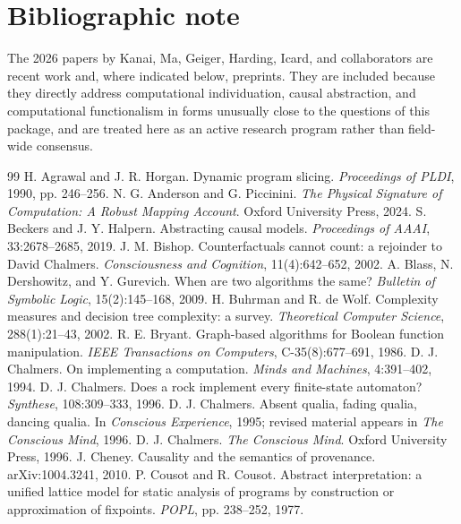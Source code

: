 \documentclass[11pt,a4paper]{article}
\begin{document}
\section*{Bibliographic note}

The 2026 papers by Kanai, Ma, Geiger, Harding, Icard, and collaborators are recent work and, where indicated below, preprints. They are included because they directly address computational individuation, causal abstraction, and computational functionalism in forms unusually close to the questions of this package, and are treated here as an active research program rather than field-wide consensus.

\begin{thebibliography}{99}
 H. Agrawal and J. R. Horgan. Dynamic program slicing. \emph{Proceedings of PLDI}, 1990, pp. 246--256.
 N. G. Anderson and G. Piccinini. \emph{The Physical Signature of Computation: A Robust Mapping Account}. Oxford University Press, 2024.
 S. Beckers and J. Y. Halpern. Abstracting causal models. \emph{Proceedings of AAAI}, 33:2678--2685, 2019.
 J. M. Bishop. Counterfactuals cannot count: a rejoinder to David Chalmers. \emph{Consciousness and Cognition}, 11(4):642--652, 2002.
 A. Blass, N. Dershowitz, and Y. Gurevich. When are two algorithms the same? \emph{Bulletin of Symbolic Logic}, 15(2):145--168, 2009.
 H. Buhrman and R. de Wolf. Complexity measures and decision tree complexity: a survey. \emph{Theoretical Computer Science}, 288(1):21--43, 2002.
 R. E. Bryant. Graph-based algorithms for Boolean function manipulation. \emph{IEEE Transactions on Computers}, C-35(8):677--691, 1986.
 D. J. Chalmers. On implementing a computation. \emph{Minds and Machines}, 4:391--402, 1994.
 D. J. Chalmers. Does a rock implement every finite-state automaton? \emph{Synthese}, 108:309--333, 1996.
 D. J. Chalmers. Absent qualia, fading qualia, dancing qualia. In \emph{Conscious Experience}, 1995; revised material appears in \emph{The Conscious Mind}, 1996.
 D. J. Chalmers. \emph{The Conscious Mind}. Oxford University Press, 1996.
 J. Cheney. Causality and the semantics of provenance. arXiv:1004.3241, 2010.
 P. Cousot and R. Cousot. Abstract interpretation: a unified lattice model for static analysis of programs by construction or approximation of fixpoints. \emph{POPL}, pp. 238--252, 1977.

\end{thebibliography}
\end{document}
